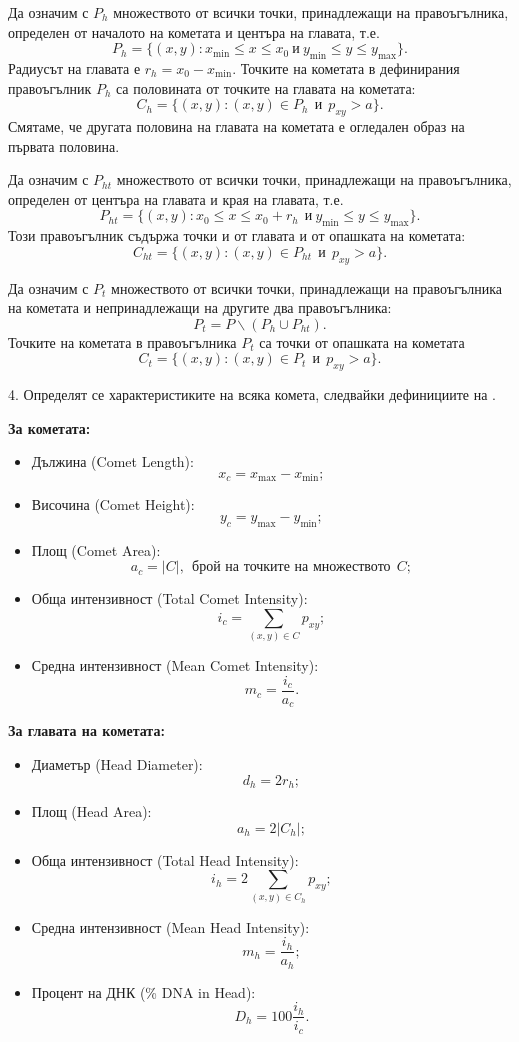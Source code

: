 \documentclass[12pt]{article}
\begin{document}
Да означим с $P_h$ множеството от всички точки,
принадлежащи на правоъгълника, определен от
началото на кометата и центъра на главата, т.е.
$$
 P_h = \{ (x,y): x_{\min} \leq x \le x_0 \ \mbox{и}\
 y_{\min} \leq y \le y_{\max} \}.
$$
Радиусът на главата е $r_h = x_0 - x_{\min}$. Точките на кометата в
дефинирания правоъгълник $P_h$ са половината от точките на главата
на кометата:
$$
  C_h = \{ (x,y): (x,y) \in P_h \ \ \mbox{и}\ \ p_{xy} > a \}.
$$
Смятаме, че другата половина на главата на кометата е огледален образ на
първата половина.

Да означим с $P_{ht}$ множеството от всички точки,
принадлежащи на правоъгълника, определен от
центъра на главата и края на главата, т.е.
$$
 P_{ht} = \{ (x,y): x_0 \leq x \le x_0 + r_h  \ \ \mbox{и}\
 y_{\min} \leq y \le y_{\max} \}.
$$
Този правоъгълник съдържа точки и от главата и от опашката на кометата:
$$
  C_{ht} = \{ (x,y): (x,y) \in P_{ht} \ \ \mbox{и}\ \ p_{xy} > a \}.
$$

Да означим с $P_t$ множеството от всички точки,
 принадлежащи на правоъгълника на кометата и непринадлежащи на
другите два правоъгълника:
$$
 P_t = P \backslash \left(P_h \cup P_{ht}\right).
$$
Точките на кометата в правоъгълника $P_t$ са точки от опашката на кометата
$$
  C_t = \{ (x,y): (x,y) \in P_t \ \ \mbox{и}\ \ p_{xy} > a \}.
$$

4. Определят се характеристиките на всяка комета, следвайки
 дефинициите на \cite{1}.

\textbf{За кометата:}
\begin{itemize}
\item
 Дължина (Comet Length):
$$
 x_c = x_{\max} - x_{\min};
$$
\item
 Височина (Comet Height):
$$
 y_c = y_{\max} - y_{\min};
$$
\item
 Площ (Comet Area):
$$
 a_c = | C |,\ \ \textrm{брой на точките на множеството} \ \ C;
$$
\item
 Обща интензивност (Total Comet Intensity):
$$
 i_c = \displaystyle\sum_{(x, y)\in C}p_{xy};
$$
\item
 Средна интензивност (Mean Comet Intensity):
$$
m_c = \displaystyle\frac{i_c}{a_c}.
$$
\end{itemize}

\textbf{За главата на кометата:}
\begin{itemize}
\item
 Диаметър (Head Diameter):
$$
 d_h = 2r_h;
$$
\item
 Площ (Head Area):
$$
 a_h = 2 | C_h |;
$$
\item
 Обща интензивност (Total Head Intensity):
$$
 i_h = 2\sum_{(x, y)\in C_h} p_{xy};
$$
\item
 Средна интензивност (Mean Head Intensity):
$$
 m_h = \frac{i_h}{a_h};
$$
\item
 Процент на ДНК (\% DNA in Head):
$$
 D_h = 100 \frac{i_h}{i_c}.
$$
\end{itemize}
\end{document}
